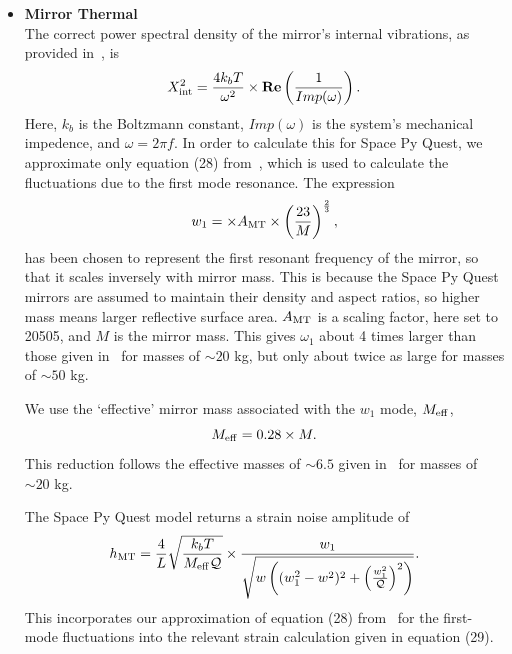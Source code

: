 \documentclass{article}
\begin{document}
    \begin{itemize}
    \item \textbf{Mirror Thermal} \\
     The correct power spectral density of the mirror's internal
     vibrations, as provided in~\cite{Virgo-sens}, is
    \begin{equation}
    X_{\rm int}^2 = \frac{4k_bT}{\omega^2} \times\text{\textbf{Re}}\left(\frac{1}{Imp(\omega )}\right).
    \end{equation}
    Here, $k_b$ is the Boltzmann constant, $Imp(\omega )$ is the
    system's mechanical impedence, and $\omega = 2\pi f$. In order to calculate this for
    Space Py Quest, we  approximate only equation (28)
    from~\cite{Virgo-sens}, which is used to calculate the
    fluctuations due to
    the first mode resonance. The expression
    \begin{equation}
    w_1 = \times A_{\rm MT} \times \left(\frac{23}{M}\right)^{\frac{2}{3}}, 
    \end{equation}
    has been chosen to represent the first resonant frequency of the
    mirror, so that it scales inversely with mirror mass. This is
    because the Space Py Quest mirrors are assumed to maintain their
    density and aspect ratios, so higher mass means larger reflective
    surface area. $A_{\rm MT}$ is a scaling factor, here set to 20505, and
    $M$ is the mirror mass. This gives $\omega_1$ about 4 times larger
    than those given in~\cite{Virgo-sens} for masses of $\sim 20$ kg, but
    only about twice as large for masses of $\sim 50$ kg. 

    We use the `effective' mirror mass associated with the $w_1$ mode, $M_{\rm eff}$,
    \begin{equation}
    M_{\rm eff} = 0.28\times M.
    \end{equation}
    This reduction follows the effective masses of $\sim 6.5$ given
    in~\cite{Virgo-sens} for masses of $\sim 20$ kg.
    
    The Space Py Quest model returns a strain noise amplitude of
    \begin{equation}
    \label{eqn::mirror}
     h_{\rm MT} =  \frac{4}{L}\sqrt{\frac{k_bT}{M_{\rm eff}\mathcal{Q}}}\times\frac{w_1}{\sqrt{w\left((w_1^2 - w^2)^2 + \left(\frac{w_1^2}{\mathcal{Q}}\right)^2\right)}}.
    \end{equation}
    This incorporates our approximation of equation (28)
    from~\cite{Virgo-sens} for the first-mode fluctuations into the
    relevant
    strain calculation given in equation (29).
    

\end{itemize}
\end{document}
